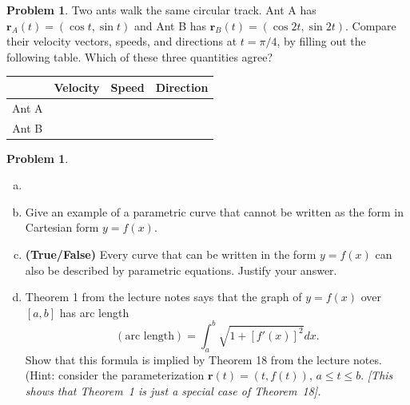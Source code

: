 \documentclass[10pt]{article}
\theoremstyle{definition}
\newtheorem{problem}[theorem]{Problem}
\newcommand{\1}[1]{\textbf{1}_{\left[#1\right]}} %
\begin{document}
\begin{problem}
  Two ants walk the same circular track. Ant A has
  $\mathbf r_{A}(t)=(\cos t,\sin t)$ and Ant B has
  $\mathbf r_{B}(t)=(\cos 2t,\sin 2t)$. Compare their velocity vectors,
  speeds, and directions at $t=\pi/4$, by filling out the following table.
  Which of these three quantities agree?
  \begin{center}
    \renewcommand{\arraystretch}{2.7}
    \begin{tabular}{|c|c|c|c|}
      \hline
      & Velocity
      & Speed 
      & Direction \\
      \hline
      Ant A & \hspace{1.8in} & \hspace{1.1in} & \hspace{1.8in} \\
      \hline
      Ant B & \hspace{1.8in} & \hspace{1.1in} & \hspace{1.8in} \\
      \hline
    \end{tabular}
  \end{center}
\end{problem}

\begin{problem}
  \begin{enumerate}[(a)]
    \item[]
    \item Give an example of a parametric curve that cannot be written as the
    form in Cartesian form $y=f(x)$.
    \vspace{1in}
    \item \textbf{(True/False)} Every curve that can be written in the form
    $y=f(x)$ can also be described by parametric equations. Justify your
    answer.
    \vspace{1in}
    \item Theorem 1 from the lecture notes says that the graph of $y=f(x)$ over
    $[a,b]$ has arc length
    \begin{equation*}
      (\text{arc length})=\int_{a}^{b}\sqrt{1+\left[ f'(x) \right]^{2} }dx.
    \end{equation*}
    Show that this formula is implied by Theorem 18 from the lecture notes.
    (Hint: consider the parameterization $\mathbf{r}(t) = (t, f(t))$,
    $a \leq t \leq b$. \textit{[This shows that Theorem~1 is just a special
      case of Theorem~18].}
    \vspace{1in}
  \end{enumerate}
\end{problem}
\end{document}
